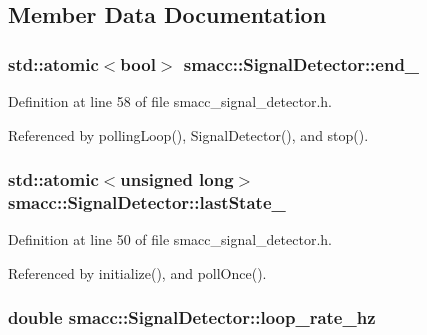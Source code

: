 \subsection{Member Data Documentation}
\subsubsection[{\texorpdfstring{end\+\_\+}{end_}}]{\setlength{\rightskip}{0pt plus 5cm}std\+::atomic$<${\bf bool}$>$ smacc\+::\+Signal\+Detector\+::end\+\_\+\hspace{0.3cm}{\ttfamily [private]}}\hypertarget{classsmacc_1_1SignalDetector_aaee266393c01693528a2d74b1f2354a2}{}\label{classsmacc_1_1SignalDetector_aaee266393c01693528a2d74b1f2354a2}


Definition at line 58 of file smacc\+\_\+signal\+\_\+detector.\+h.



Referenced by polling\+Loop(), Signal\+Detector(), and stop().

\subsubsection[{\texorpdfstring{last\+State\+\_\+}{lastState_}}]{\setlength{\rightskip}{0pt plus 5cm}std\+::atomic$<$unsigned long$>$ smacc\+::\+Signal\+Detector\+::last\+State\+\_\+\hspace{0.3cm}{\ttfamily [private]}}\hypertarget{classsmacc_1_1SignalDetector_a72293ed0e98f4200fbe75b53f1e41eab}{}\label{classsmacc_1_1SignalDetector_a72293ed0e98f4200fbe75b53f1e41eab}


Definition at line 50 of file smacc\+\_\+signal\+\_\+detector.\+h.



Referenced by initialize(), and poll\+Once().

\subsubsection[{\texorpdfstring{loop\+\_\+rate\+\_\+hz}{loop_rate_hz}}]{\setlength{\rightskip}{0pt plus 5cm}double smacc\+::\+Signal\+Detector\+::loop\+\_\+rate\+\_\+hz\hspace{0.3cm}{\ttfamily [private]}}\hypertarget{classsmacc_1_1SignalDetector_a41a2ae4262ed350f46d8b886bdc1dfa5}{}\label{classsmacc_1_1SignalDetector_a41a2ae4262ed350f46d8b886bdc1dfa5}


